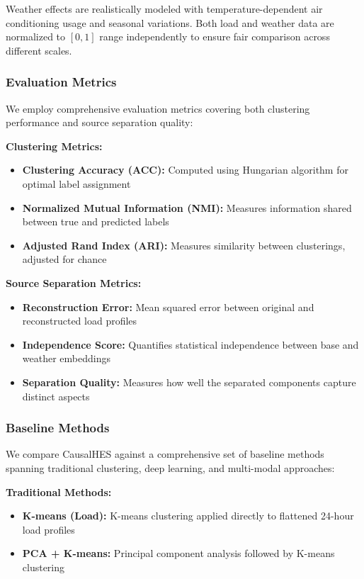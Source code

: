 \documentclass[journal]{IEEEtran}
\begin{document}
Weather effects are realistically modeled with temperature-dependent air conditioning usage and seasonal variations. Both load and weather data are normalized to $[0,1]$ range independently to ensure fair comparison across different scales.

\subsubsection{Evaluation Metrics}
We employ comprehensive evaluation metrics covering both clustering performance and source separation quality:

\textbf{Clustering Metrics:}
\begin{itemize}
    \item \textbf{Clustering Accuracy (ACC):} Computed using Hungarian algorithm for optimal label assignment
    \item \textbf{Normalized Mutual Information (NMI):} Measures information shared between true and predicted labels
    \item \textbf{Adjusted Rand Index (ARI):} Measures similarity between clusterings, adjusted for chance
\end{itemize}

\textbf{Source Separation Metrics:}
\begin{itemize}
    \item \textbf{Reconstruction Error:} Mean squared error between original and reconstructed load profiles
    \item \textbf{Independence Score:} Quantifies statistical independence between base and weather embeddings
    \item \textbf{Separation Quality:} Measures how well the separated components capture distinct aspects
\end{itemize}

\subsubsection{Baseline Methods}
We compare CausalHES against a comprehensive set of baseline methods spanning traditional clustering, deep learning, and multi-modal approaches:

\textbf{Traditional Methods:}
\begin{itemize}
    \item \textbf{K-means (Load):} K-means clustering applied directly to flattened 24-hour load profiles
    \item \textbf{PCA + K-means:} Principal component analysis followed by K-means clustering
\end{itemize}
\end{document}
